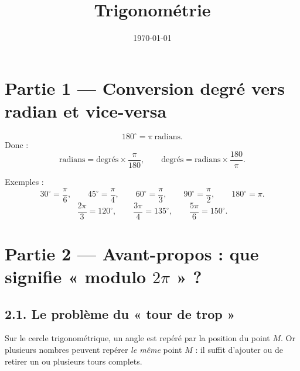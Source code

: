 \documentclass[11pt,a4paper]{article}
\title{Trigonométrie}
\author{}
\date{\today}
\begin{document}
\maketitle

\clearpage
\section*{Partie 1 — Conversion degré vers radian et vice-versa}

\[
180^\circ=\pi\ \text{radians}.
\]
Donc :
\[
\text{radians}=\text{degrés}\times \dfrac{\pi}{180},
\qquad
\text{degrés}=\text{radians}\times \dfrac{180}{\pi}.
\]

Exemples :
\[
30^\circ=\dfrac{\pi}{6},\qquad
45^\circ=\dfrac{\pi}{4},\qquad
60^\circ=\dfrac{\pi}{3},\qquad
90^\circ=\dfrac{\pi}{2},\qquad
180^\circ=\pi.
\]
\[
\dfrac{2\pi}{3}=120^\circ,\qquad
\dfrac{3\pi}{4}=135^\circ,\qquad
\dfrac{5\pi}{6}=150^\circ.
\]

\clearpage
\section*{Partie 2 — Avant-propos : que signifie « modulo $2\pi$ » ?}

\subsection*{2.1. Le problème du « tour de trop »}

Sur le cercle trigonométrique, un angle est repéré par la position du point $M$. Or plusieurs nombres peuvent repérer \emph{le même} point $M$ : il suffit d'ajouter ou de retirer un ou plusieurs tours complets.

\begin{center}
\end{center}
\end{document}
